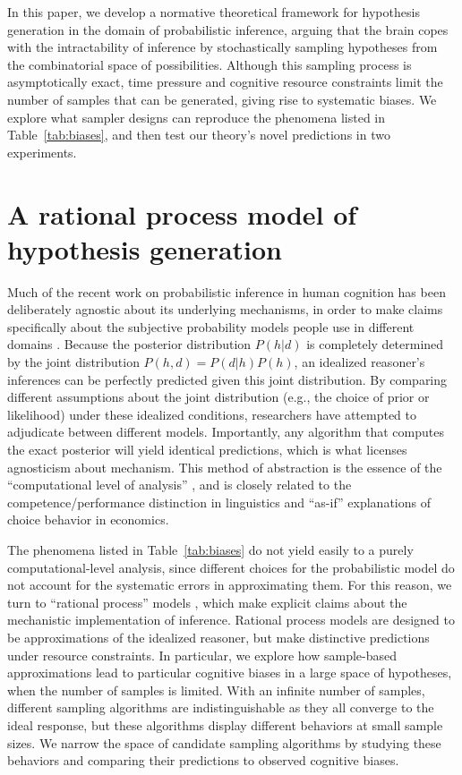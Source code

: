 In this paper, we develop a normative theoretical framework for hypothesis generation in the domain of probabilistic inference, arguing that the brain copes with the intractability of inference by stochastically sampling hypotheses from the combinatorial space of possibilities. Although this sampling process is asymptotically exact, time pressure and cognitive resource constraints limit the number of samples that can be generated, giving rise to systematic biases. We explore what sampler designs can reproduce the phenomena listed in Table~\ref{tab:biases}, and then test our theory's novel predictions in two experiments.

\section{A rational process model of hypothesis generation}

Much of the recent work on probabilistic inference in human cognition has been deliberately agnostic about its underlying mechanisms, in order to make claims specifically about the subjective probability models people use in different domains \citep{chater2006}. Because the posterior distribution $P(h|d)$ is completely determined by the joint distribution $P(h,d) = P(d|h)P(h)$, an idealized reasoner's inferences can be perfectly predicted given this joint distribution. By comparing different assumptions about the joint distribution (e.g., the choice of prior or likelihood) under these idealized conditions, researchers have attempted to adjudicate between different models. Importantly, any algorithm that computes the exact posterior will yield identical predictions, which is what licenses agnosticism about mechanism. This method of abstraction is the essence of the ``computational level of analysis'' \citep{marr1976understanding}, and is closely related to the competence/performance distinction in linguistics and ``as-if'' explanations of choice behavior in economics.

The phenomena listed in Table~\ref{tab:biases} do not yield easily to a purely computational-level analysis, since different choices for the probabilistic model do not account for the systematic errors in approximating them. For this reason, we turn to ``rational process'' models \citep[see][for a review]{Griffiths2012BridgingCognition}, which make explicit claims about the mechanistic implementation of inference. Rational process models are designed to be approximations of the idealized reasoner, but make distinctive predictions under resource constraints. In particular, we explore how sample-based approximations lead to particular cognitive biases in a large space of hypotheses, when the number of samples is limited.
With an infinite number of samples, different sampling algorithms are indistinguishable as they all converge to the ideal response, but these algorithms display different behaviors at small sample sizes. We narrow the space of candidate sampling algorithms by studying these behaviors and comparing their predictions to observed cognitive biases.


